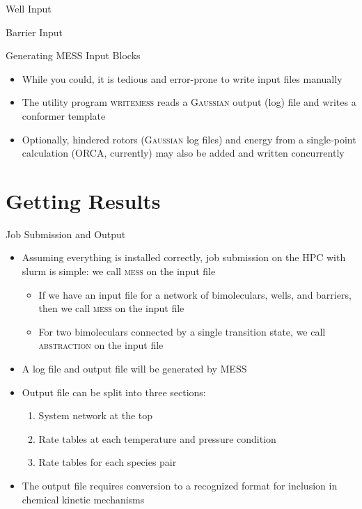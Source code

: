 \documentclass[10pt,presentation]{beamer}
\begin{document}
\begin{frame}[fragile]{Well Input}
  \vspace{-0.8cm}
  \tiny{
  
  }
\end{frame}

\begin{frame}[fragile]{Barrier Input}
  \vspace{-0.8cm}
  \tiny{
  
  }
\end{frame}

\begin{frame}{Generating \textsc{MESS} Input Blocks}
  \begin{itemize}
   \item While you could, it is tedious and error-prone to write input files manually
   \item The utility program \textsc{writemess} reads a \textsc{Gaussian} output (log) file and writes a conformer template
   \item Optionally, hindered rotors (\textsc{Gaussian} log files) and energy from a single-point calculation (\textsc{ORCA}, currently) may also be added and written concurrently
  \end{itemize}
\end{frame}

\section{Getting Results}
\begin{frame}{Job Submission and Output}
  \begin{itemize}
   \item Assuming everything is installed correctly, job submission on the HPC with slurm is simple: we call \textsc{mess} on the input file
   \begin{itemize}
    \item If we have an input file for a network of bimoleculars, wells, and barriers, then we call \textsc{mess} on the input file
    \item For two bimoleculars connected by a single transition state, we call \textsc{abstraction} on the input file
   \end{itemize}
   \item A log file and output file will be generated by \textsc{MESS}
   \item Output file can be split into three sections:
    \begin{enumerate}
     \item System network at the top
     \item Rate tables at each temperature and pressure condition
     \item Rate tables for each species pair
    \end{enumerate}
   \item The output file requires conversion to a recognized format for inclusion in chemical kinetic mechanisms
  \end{itemize}
\end{frame}
\end{document}
